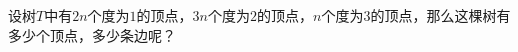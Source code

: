 \begin{Exercise}
  设树$T$中有$2n$个度为$1$的顶点，$3n$个度为$2$的顶点，$n$个度为$3$的顶点，那么这棵树有多少个顶点，多少条边呢？
\end{Exercise}
